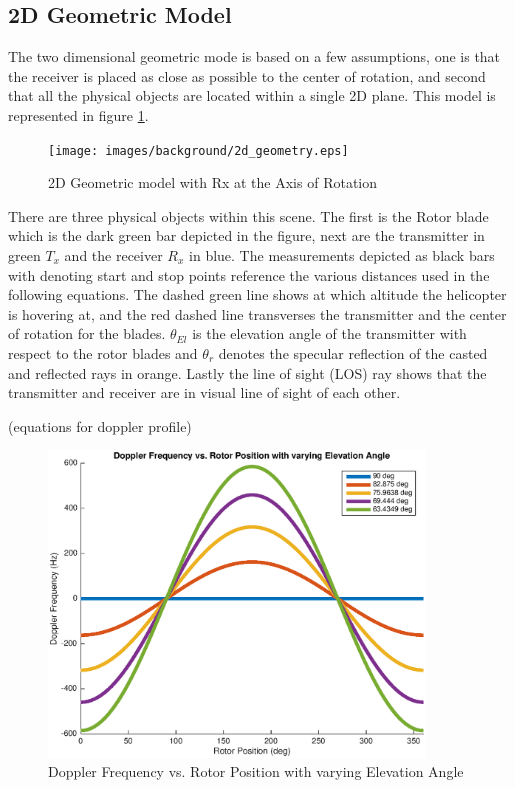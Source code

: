 \subsection{2D Geometric Model}
The two dimensional geometric mode is based on a few assumptions, one is that the receiver is placed as close as possible to the center of rotation, and second that all the physical objects are located within a single 2D plane. This model is represented in figure \ref{fig:2D_model}.

\begin{figure}[h]
	\begin{center}
		\texttt{[image: images/background/2d\_geometry.eps]}
		\caption{2D Geometric model with Rx at the Axis of Rotation}
		\label{fig:2D_model}
	\end{center}
\end{figure}

There are three physical objects within this scene. The first is the Rotor blade which is the dark green bar depicted in the figure, next are the transmitter in green $T_x$ and the receiver $R_x$ in blue. The measurements depicted as black bars with denoting start and stop points reference the various distances used in the following equations. The dashed green line shows at which altitude the helicopter is hovering at, and the red dashed line transverses the transmitter and the center of rotation for the blades. $\theta_{El}$ is the elevation angle of the transmitter with respect to the rotor blades and $\theta_r$ denotes the specular reflection of the casted and reflected rays in orange. Lastly the line of sight (LOS) ray shows that the transmitter and receiver are in visual line of sight of each other.

(equations for doppler profile)

\begin{figure}
	\begin{center}
		\includegraphics[width=10cm]{images/background/2d_theoretical_doppler_profile.eps}
		\caption{Doppler Frequency vs. Rotor Position with varying Elevation Angle}
		\label{fig:2D_theoretical_doppler}
	\end{center}
\end{figure}

